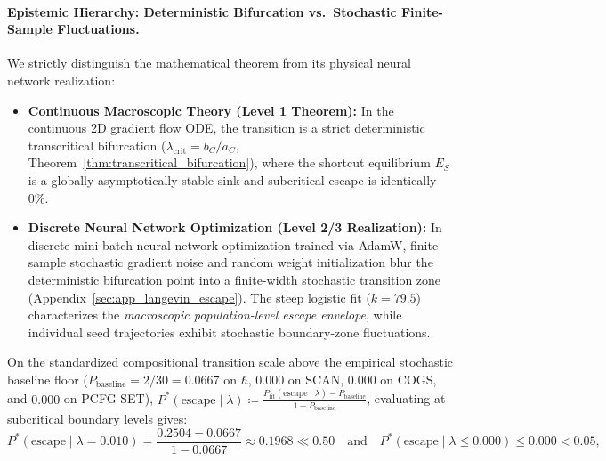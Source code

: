 \documentclass{article}
\theoremstyle{plain}
\theoremstyle{definition}
\begin{document}
\paragraph{Epistemic Hierarchy: Deterministic Bifurcation vs.\ Stochastic Finite-Sample Fluctuations.}
We strictly distinguish the mathematical theorem from its physical neural network realization:
\begin{itemize}[leftmargin=*,noitemsep]
    \item \textbf{Continuous Macroscopic Theory (Level 1 Theorem):} In the continuous 2D gradient flow ODE, the transition is a strict deterministic transcritical bifurcation ($\lambda_{\text{crit}} = b_C / a_C$, Theorem~\ref{thm:transcritical_bifurcation}), where the shortcut equilibrium $E_S$ is a globally asymptotically stable sink and subcritical escape is identically $0\%$.
    \item \textbf{Discrete Neural Network Optimization (Level 2/3 Realization):} In discrete mini-batch neural network optimization trained via AdamW, finite-sample stochastic gradient noise and random weight initialization blur the deterministic bifurcation point into a finite-width stochastic transition zone (Appendix~\ref{sec:app_langevin_escape}). The steep logistic fit ($k = 79.5$) characterizes the \emph{macroscopic population-level escape envelope}, while individual seed trajectories exhibit stochastic boundary-zone fluctuations.
\end{itemize}
On the standardized compositional transition scale above the empirical stochastic baseline floor ($P_{\text{baseline}} = 2/30 = 0.0667$ on $\hbar$, $0.000$ on SCAN, $0.000$ on COGS, and $0.000$ on PCFG-SET), $P^*(\text{escape} \mid \lambda) \coloneqq \frac{P_{\text{fit}}(\text{escape} \mid \lambda) - P_{\text{baseline}}}{1 - P_{\text{baseline}}}$, evaluating at subcritical boundary levels gives:
\begin{equation}
    P^*(\text{escape} \mid \lambda = 0.010) = \frac{0.2504 - 0.0667}{1 - 0.0667} \approx 0.1968 \ll 0.50 \quad \text{and} \quad P^*(\text{escape} \mid \lambda \le 0.000) \le 0.000 < 0.05,
\end{equation}
\end{document}
